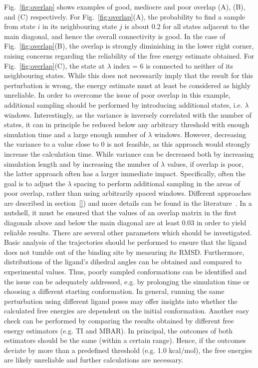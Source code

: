 \documentclass[9pt,bestpractices]{livecoms}
\begin{document}
Fig.~\ref{fig:overlap} shows examples of good, mediocre and poor overlap (A), (B), and (C) respectively. For Fig.~\ref{fig:overlap}(A), the probability to find a sample from state $i$ in its neighbouring state $j$ is about 0.2 for all states adjacent to the main diagonal, and hence the overall connectivity is good. In the case of Fig.~\ref{fig:overlap}(B), the overlap is strongly diminishing in the lower right corner, raising concerns regarding the reliability of the free energy estimate obtained. For Fig.~\ref{fig:overlap}(C), the state at $\lambda$ index = 6 is connected to neither of its neighbouring states. While this does not necessarily imply that the result for this perturbation is wrong, the energy estimate must at least be considered as highly unreliable.
In order to overcome the issue of poor overlap in this example, additional sampling should be performed by introducing additional states, i.e. $\lambda$ windows.
%
Interestingly, as the variance is inversely correlated with the number of states\cite{klimovich2015guidelines}, it can in principle be reduced below any arbitrary threshold with enough simulation time and a large enough number of $\lambda$ windows. However, decreasing the variance to a value close to 0 is not feasible, as this approach would strongly increase the calculation time. While variance can be decreased both by increasing simulation length and by increasing the number of $\lambda$ values, if overlap is poor, the latter approach often has a larger immediate impact.  Specifically, often the goal is to adjust the $\lambda$ spacing to perform additional sampling in the areas of poor overlap, rather than using arbitrarily spaced windows. Different approaches are described in section~\ref{}) and more details can be found in the literature~\cite{dakka2018concurrent, hahn2019alchemical}.
%
In a nutshell, it must be ensured that the values of an overlap matrix in the first diagonals above and below the main diagonal are at least 0.03 in order to yield reliable results. 
%
There are several other parameters which should be investigated. Basic analysis of the trajectories should be performed to ensure that the ligand does not tumble out of the binding site by measuring its RMSD. Furthermore, distributions of the ligand's dihedral angles can be obtained and compared to experimental values. Thus, poorly sampled conformations can be identified and the issue can be adequately addressed, e.g. by prolonging the simulation time or choosing a different starting conformation. In general, running the same perturbation using different ligand poses may offer insights into whether the calculated free energies are dependent on the initial conformation.
Another easy check can be performed by comparing the results obtained by different free energy estimators (e.g. TI and MBAR). In principal, the outcomes of both estimators should be the same (within a certain range). Hence, if the outcomes deviate by more than a predefined threshold (e.g. 1.0 kcal/mol), the free energies are likely unreliable and further calculations are necessary.
%
\end{document}
